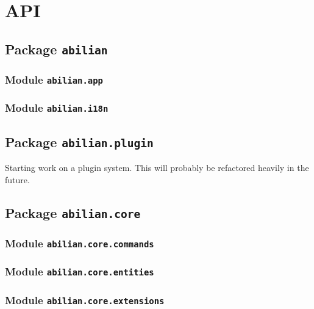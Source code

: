 \documentclass[a4paper,12pt,english]{sphinxmanual}
\begin{document}
\chapter{API}
\label{api:api}\label{api::doc}

\section{Package \texttt{abilian}}
\label{api:package-abilian}

\subsection{Module \texttt{abilian.app}}
\label{api:module-abilian-app}

\subsection{Module \texttt{abilian.i18n}}
\label{api:module-abilian-i18n}

\section{Package \texttt{abilian.plugin}}
\label{api:module-abilian.plugin}\label{api:package-abilian-plugin}
Starting work on a plugin system. This will probably be refactored heavily
in the future.


\section{Package \texttt{abilian.core}}
\label{api:package-abilian-core}

\subsection{Module \texttt{abilian.core.commands}}
\label{api:module-abilian-core-commands}

\subsection{Module \texttt{abilian.core.entities}}
\label{api:module-abilian-core-entities}

\subsection{Module \texttt{abilian.core.extensions}}
\label{api:module-abilian-core-extensions}
\end{document}
